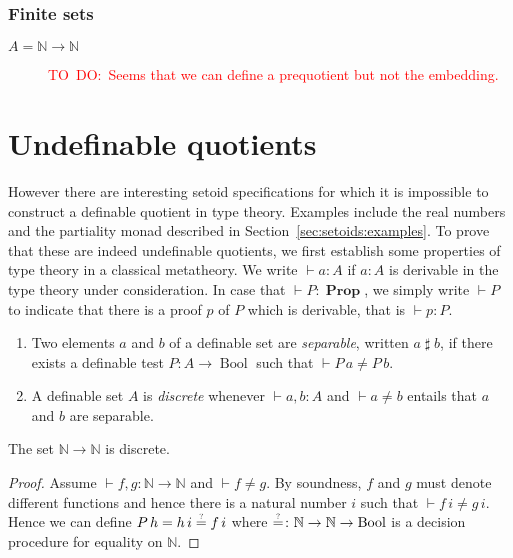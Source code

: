 \documentclass[envcountsame]{llncs}
\newcommand{\todo}[1]{\textcolor{red}{TO~DO:~#1}}
\newcommand{\N}{\mathbb{N}}
\DeclareMathOperator{\Prop}{\mathbf{Prop}}
\DeclareMathOperator{\Bool}{Bool}
\newcommand{\eqqm}{\overset{\text{\tiny ?}}{=}}
\newcommand{\sep}{\mathrel{\sharp}}
\begin{document}
\subsubsection*{Finite sets}
\begin{description}
\item[$A=\N\to\N$] \todo{Seems that we can define a prequotient but not the embedding.}

\end{description}




\section{Undefinable quotients}
However there are interesting setoid specifications for which it is impossible to construct a definable quotient in type theory. Examples include the real numbers and the partiality monad described in Section~\ref{sec:setoids:examples}.
To prove that these are indeed undefinable quotients, we first establish some properties of type theory in a classical metatheory.
We write $\vdash a : A$ if $a : A$ is derivable in the type theory under consideration. In case that $\vdash P : \Prop$, we simply  write $\vdash P$ to indicate that there is a proof $p$ of $P$ which is derivable, that is $\vdash p : P$.
\begin{definition}\hfill
\begin{enumerate}
\item Two elements $a$ and $b$ of a definable set are \emph{separable}, written $a \sep b$, if there exists a definable test $P\colon A\to \Bool$ such that $\vdash P\,a \neq P\,b$.
\item A definable set $A$ is \emph{discrete} whenever $\vdash a, b :A$ and   $\vdash a\not= b$
entails that $a$ and $b$ are separable.
\end{enumerate}
\end{definition}

\begin{proposition}\label{prop:NtoNdiscrete}
The set $\N\to\N$ is discrete.
\end{proposition}
\begin{proof}
Assume $\vdash f, g\colon \N \to \N$ and $\vdash f\neq g$. By soundness, $f$ and $g$ must denote different functions and hence there is a natural number $i$ such that $\vdash f\,i\neq g\,i$. Hence we can define $P\,h = {h\,i} \eqqm {f\,i}$ where ${\eqqm}\colon \N\to\N\to\Bool$ is a decision procedure for equality on $\N$.
\end{proof}
\end{document}
